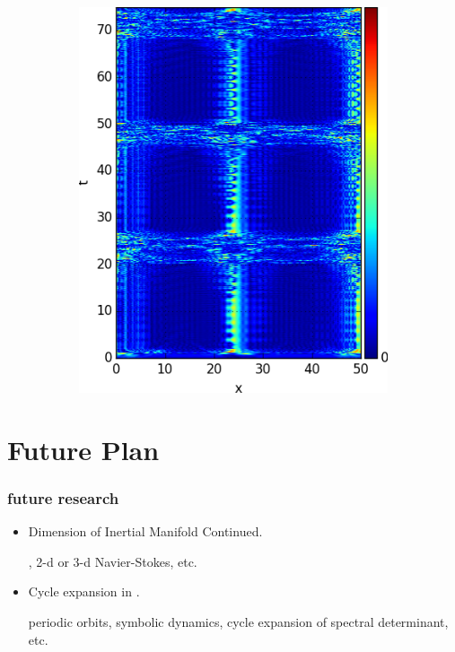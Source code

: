 \documentclass[mathserif, handout]{beamer}
\begin{document}
\begin{frame}[allowframebreaks]
\begin{figure}[h]
\begin{subfigure}{.23\linewidth}
    \includegraphics[width=\textwidth]{cqcglAllReduceT75h005}
    \label{}
  \end{subfigure}
  \label{fig:cqcglReduceSymT75h005}
\end{figure}

\end{frame}

\section{Future Plan}

\begin{frame}
  \frametitle{future research}

  \begin{itemize}
    \setlength\itemsep{4em}
  \item Dimension of Inertial Manifold Continued.
    \vspace{1em}

    \cGLe, 2-d or 3-d Navier-Stokes, etc.

  \item Cycle expansion in \cqcGLe.
    \vspace{1em}

    periodic orbits, symbolic dynamics, cycle expansion of spectral determinant, etc.

  \end{itemize}
\end{frame}
\end{document}
